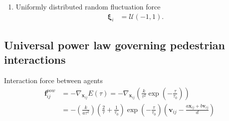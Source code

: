 \begin{enumerate}[label=\roman{enumi})]
\item 
Uniformly distributed random fluctuation force
\begin{align}
\boldsymbol{\xi}_{i} &= \boldsymbol{\mathcal{U}}(-1, 1).
\end{align}


\end{enumerate}


\subsection{Universal power law governing pedestrian interactions}
Interaction force between agents
\begin{align}
\mathbf{f}_{ij}^{pow} &= -\nabla_{\mathbf{x}_{ij}} E(\tau) 
= -\nabla_{\mathbf{x}_{ij}} \left(\frac{k}{\tau^{2}} \exp \left( -\frac{\tau}{\tau_{0}} \right) \right) \\
&= - \left(\frac{k}{a \tau^{2}}\right) 
\left(\frac{2}{\tau} + \frac{1}{\tau_{0}}\right) 
\exp\left (-\frac{\tau}{\tau_{0}}\right )
\left(\mathbf{v}_{ij} -\frac{a \mathbf{x}_{ij} + b \mathbf{v}_{ij}}{d} \right) 
\end{align}



